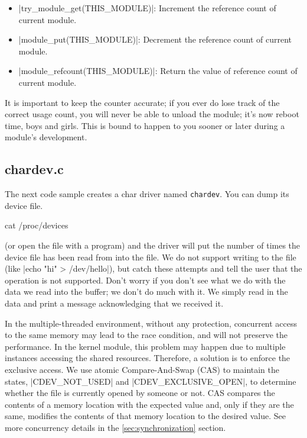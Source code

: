 \documentclass[10pt, oneside]{book}
\begin{document}
\begin{itemize}
  \item \cpp|try_module_get(THIS_MODULE)|: Increment the reference count of current module.
  \item \cpp|module_put(THIS_MODULE)|: Decrement the reference count of current module.
  \item \cpp|module_refcount(THIS_MODULE)|: Return the value of reference count of current module.
\end{itemize}

It is important to keep the counter accurate; if you ever do lose track of the correct usage count, you will never be able to unload the module; it's now reboot time, boys and girls.
This is bound to happen to you sooner or later during a module's development.

\subsection{chardev.c}
\label{sec:chardev_c}
The next code sample creates a char driver named \verb|chardev|.
You can dump its device file.

\begin{codebash}
cat /proc/devices
\end{codebash}

(or open the file with a program) and the driver will put the number of times the device file has been read from into the file.
We do not support writing to the file (like \sh|echo "hi" > /dev/hello|), but catch these attempts and tell the user that the operation is not supported.
Don't worry if you don't see what we do with the data we read into the buffer; we don't do much with it.
We simply read in the data and print a message acknowledging that we received it.

In the multiple-threaded environment, without any protection, concurrent access to the same memory may lead to the race condition, and will not preserve the performance.
In the kernel module, this problem may happen due to multiple instances accessing the shared resources.
Therefore, a solution is to enforce the exclusive access.
We use atomic Compare-And-Swap (CAS) to maintain the states, \cpp|CDEV_NOT_USED| and \cpp|CDEV_EXCLUSIVE_OPEN|, to determine whether the file is currently opened by someone or not.
CAS compares the contents of a memory location with the expected value and, only if they are the same, modifies the contents of that memory location to the desired value.
See more concurrency details in the \ref{sec:synchronization} section.
\end{document}
